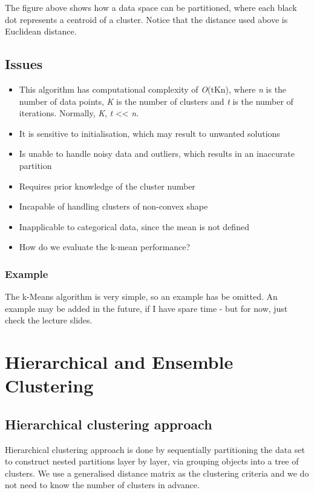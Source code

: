 \documentclass[11pt,fleqn]{book} %
\begin{document}
\noindent
The figure above shows how a data space can be partitioned, where each black dot represents a centroid of a cluster. Notice that the distance used above is Euclidean distance.

\section{Issues}

\begin{itemize}
	\item This algorithm has computational complexity of \textit{O}(tKn), where \textit{n} is the number of data points, \textit{K} is the number of clusters and \textit{t} is the number of iterations. Normally, \textit{K}, \textit{t} << \textit{n}.
	\item It is sensitive to initialisation, which may result to unwanted solutions
	\item Is unable to handle noisy data and outliers, which results in an inaccurate partition
	\item Requires prior knowledge of the cluster number
	\item Incapable of handling clusters of non-convex shape
	\item Inapplicable to categorical data, since the mean is not defined
	\item How do we evaluate the k-mean performance?
\end{itemize}

\subsection*{Example}
The k-Means algorithm is very simple, so an example has be omitted. An example may be added in the future, if I have spare time - but for now, just check the lecture slides.



\chapter{Hierarchical and Ensemble Clustering}

\section{Hierarchical clustering approach}
Hierarchical clustering approach is done by sequentially partitioning the data set to construct nested partitions layer by layer, via grouping objects into a tree of clusters. We use a generalised distance matrix as the clustering criteria and we do not need to know the number of clusters in advance.
\end{document}
